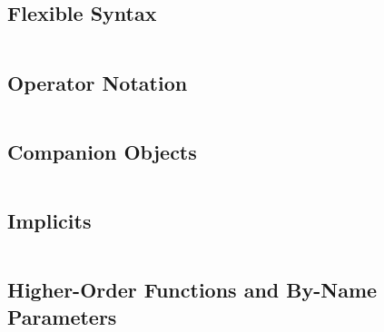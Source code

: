 \begin{lstlisting}[language=Scala]
\end{lstlisting}


\subsection{Flexible Syntax}

\begin{lstlisting}[language=Scala]
\end{lstlisting}

\subsection{Operator Notation}

\begin{lstlisting}[language=Scala]
\end{lstlisting}

\subsection{Companion Objects}

\begin{lstlisting}[language=Scala]
\end{lstlisting}

\subsection{Implicits}

\begin{lstlisting}[language=Scala]
\end{lstlisting}

\subsection{Higher-Order Functions and By-Name Parameters}

\begin{lstlisting}[language=Scala]
\end{lstlisting}
